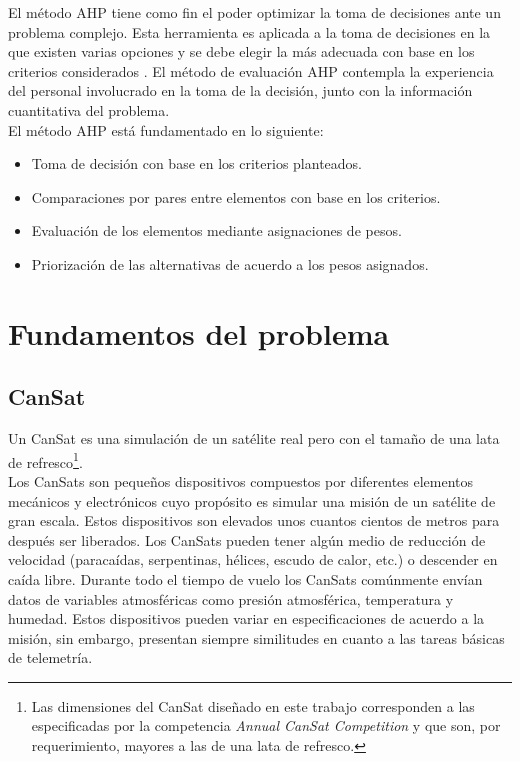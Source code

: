 \noindent El m\'etodo AHP tiene como fin el poder optimizar la toma de decisiones ante un problema complejo. Esta herramienta es aplicada a la toma de decisiones en la que existen varias opciones y se debe elegir la m\'as adecuada con base en los criterios considerados \cite{saaty_2008}. El m\'etodo de evaluaci\'on AHP contempla la experiencia del personal involucrado en la toma de la decisi\'on, junto con la informaci\'on cuantitativa del problema.\\

\noindent El m\'etodo AHP est\'a fundamentado en lo siguiente:

\begin{itemize}
	\item Toma de decisi\'on con base en los criterios planteados.
	\item Comparaciones por pares entre elementos con base en los criterios.
	\item Evaluaci\'on de los elementos mediante asignaciones de pesos.
	\item Priorizaci\'on de las alternativas de acuerdo a los pesos asignados.
\end{itemize}

	\section{Fundamentos del problema} \label{sec:basics}
		\subsection{CanSat} \label{subsec:cansat}
Un CanSat es una simulaci\'on de un sat\'elite real pero con el tama\~{n}o de una lata de refresco\footnote{Las dimensiones del CanSat dise\~{n}ado en este trabajo corresponden a las especificadas por la competencia \textit{Annual CanSat Competition} y que son, por requerimiento, mayores a las de una lata de refresco.}.\\

\noindent Los CanSats son peque\~{n}os dispositivos compuestos por diferentes elementos mec\'anicos y electr\'onicos cuyo prop\'osito es simular una misi\'on de un sat\'elite de gran escala. Estos dispositivos son elevados unos cuantos cientos de metros para despu\'es ser liberados. Los CanSats pueden tener alg\'un medio de reducci\'on de velocidad (paraca\'idas, serpentinas, h\'elices, escudo de calor, etc.) o descender en ca\'ida libre. Durante todo el tiempo de vuelo los CanSats com\'unmente env\'ian datos de variables atmosf\'ericas como presi\'on atmosf\'erica, temperatura y humedad. Estos dispositivos pueden variar en especificaciones de acuerdo a la misi\'on, sin embargo, presentan siempre similitudes en cuanto a las tareas b\'asicas de telemetr\'ia.\\

